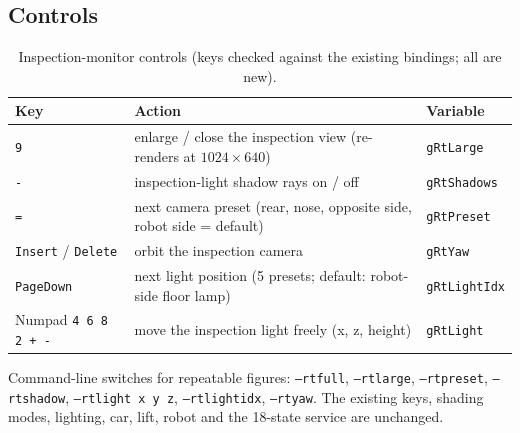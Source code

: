 \documentclass[10pt,a4paper]{article}
\newcommand{\fn}[1]{\texttt{#1}}
\let\oldtoprule\toprule
\renewcommand{\toprule}{\oldtoprule\rowcolor{smhead}}
\begin{document}
\subsection{Controls}
\begin{table}[!htbp]\centering\scriptsize
\caption{Inspection-monitor controls (keys checked against the existing bindings; all are new).}\label{tab:rtkeys}
\begin{tabular}{@{}>{\raggedright}p{3.2cm}>{\raggedright}p{6.4cm}>{\raggedright\arraybackslash}p{5.2cm}@{}}\toprule
Key & Action & Variable\\\midrule
\fn{9} & enlarge / close the inspection view (re-renders at $1024{\times}640$) & \fn{gRtLarge}\\
\fn{-} & inspection-light shadow rays on / off & \fn{gRtShadows}\\
\fn{=} & next camera preset (rear, nose, opposite side, robot side = default) & \fn{gRtPreset}\\
\fn{Insert} / \fn{Delete} & orbit the inspection camera & \fn{gRtYaw}\\
\fn{PageDown} & next light position (5 presets; default: robot-side floor lamp) & \fn{gRtLightIdx}\\
Numpad \fn{4 6 8 2 + -} & move the inspection light freely (x, z, height) & \fn{gRtLight}\\\bottomrule
\end{tabular}
\end{table}
Command-line switches for repeatable figures: \fn{--rtfull}, \fn{--rtlarge}, \fn{--rtpreset}, \fn{--rtshadow}, \fn{--rtlight x y z}, \fn{--rtlightidx}, \fn{--rtyaw}. The existing keys, shading modes, lighting, car, lift, robot and the 18-state service are unchanged.
\end{document}
